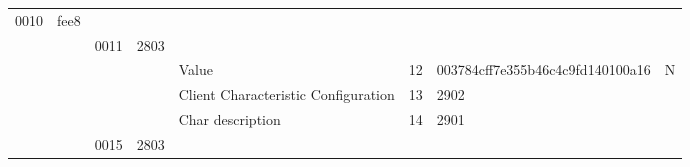 \documentclass[conference]{IEEEtran}
\begin{document}
\begin{landscape}
\begin{table}[ht]
\begin{tabular}{@{}llllllll@{}}
\rowcolor[HTML]{3166FF} 
{\color[HTML]{000000} 0010} & {\color[HTML]{000000} fee8} & {\color[HTML]{000000} }      & {\color[HTML]{000000} }      & {\color[HTML]{000000} }                                                                & {\color[HTML]{000000} }  & {\color[HTML]{000000} }          & {\color[HTML]{000000} }                                                                                            \\
                            &                             & \cellcolor[HTML]{FFFE65}0011 & \cellcolor[HTML]{FFFE65}2803 & \cellcolor[HTML]{FFFE65}                                                               & \cellcolor[HTML]{FFFE65} & \cellcolor[HTML]{FFFE65}         & \cellcolor[HTML]{FFFE65}                                                                                           \\
                            &                             &                              &                              & Value                                                                                  & 12                       & 003784cff7e355b46c4c9fd140100a16 & N                                                                                                                  \\
                            &                             &                              &                              & Client Characteristic Configuration                                                    & 13                       & 2902                             &                                                                                                                    \\
                            &                             &                              &                              & Char description                                                                       & 14                       & 2901                             &                                                                                                                    \\
                            &                             & \cellcolor[HTML]{FFFE65}0015 & \cellcolor[HTML]{FFFE65}2803 & \cellcolor[HTML]{FFFE65}                                                               & \cellcolor[HTML]{FFFE65} & \cellcolor[HTML]{FFFE65}         & \cellcolor[HTML]{FFFE65}                                                                                           \\

\end{tabular}
\end{table}
\end{landscape}
\end{document}
